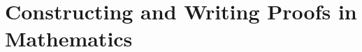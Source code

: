 \chapter[Constructing and Writing Proofs in Mathematics]{Constructing and Writing Proofs in Mathematics} \label{C:proofs}


%








%


%


%
%

\endinput
